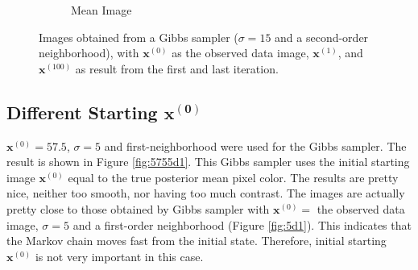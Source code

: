 \begin{figure}[!h]
\begin{subfigure}[b]{0.24\textwidth}
            \caption[]%
            {{\small Mean Image}}    
            \label{fig:15d2mean}
        \end{subfigure}
        \caption[]
        {\small Images obtained from a Gibbs sampler ($\sigma=15$ and a second-order neighborhood), with $\mathbf{x}^{(0)}$ as the observed data image, $\mathbf{x}^{(1)}$, and $\mathbf{x}^{(100)}$ as result from the first and last iteration. }
        \label{fig:15d2}
    \end{figure}
\subsection{Different Starting $\mathbf{x^{(0)}}$}
$\mathbf{x}^{(0)}=57.5$, $\sigma=5$ and first-neighborhood were used for the Gibbs sampler. 
The result is shown in Figure \ref{fig:5755d1}. 
This Gibbs sampler uses the initial starting image $\mathbf{x}^{(0)}$ equal to the true posterior mean pixel color.
The results are pretty nice, neither too smooth, nor having too much contrast. 
The images are actually pretty close to those obtained by Gibbs sampler with $\mathbf{x}^{(0)}=$ the observed data image, $\sigma=5$ and a first-order neighborhood (Figure \ref{fig:5d1}). 
This indicates that the Markov chain moves fast from the initial state. 
Therefore, initial starting $\mathbf{x}^{(0)}$ is not very important in this case. 
